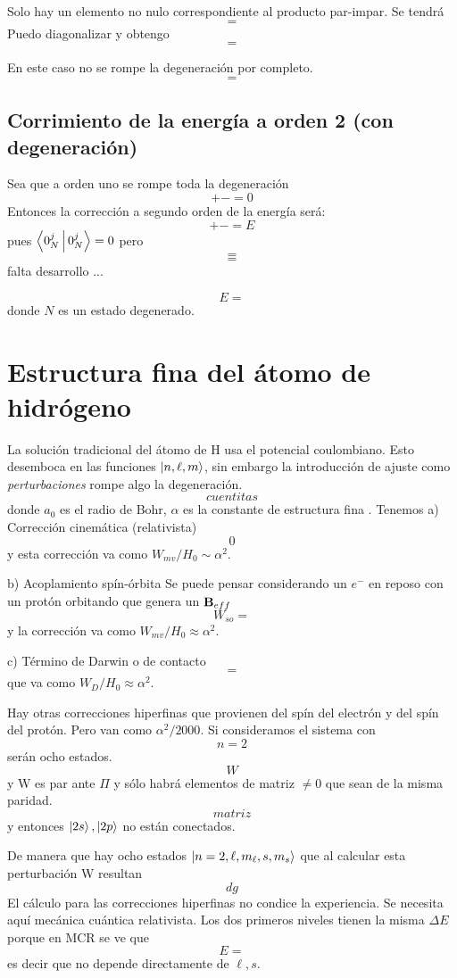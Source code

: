 \documentclass[10pt,oneside]{CBFT_book}
\begin{document}
Solo hay un elemento no nulo correspondiente al producto par-impar.
Se tendrá 
\[
	=
\]
Puedo diagonalizar y obtengo 
\[
	=
\]

En este caso no se rompe la degeneración por completo.
\[
	=
\]


\subsection{Corrimiento de la energía a orden 2 (con degeneración)}

Sea que a orden uno se rompe toda la degeneración 
\[
	+ - = 0
\]
Entonces la corrección a segundo orden de la energía será:
\[
	+ - = E
\]
pues $\Braket{0_N^j|0_N^j}= 0$ pero 
\[
	=
\]
\[
	=
\]
falta desarrollo ...

\[
	E =
\]
donde $N$ es un estado degenerado.

\section{Estructura fina del átomo de hidrógeno}

La solución tradicional del átomo de H usa el potencial coulombiano. Esto desemboca en las funciones 
$\Ket{n,\ell,m}$, sin embargo la introducción de ajuste como {\it perturbaciones} rompe algo la degeneración.
\[
	cuentitas
\]
donde $a_0$ es el radio de Bohr, $\alpha$ es la constante de estructura fina .
Tenemos 
a) Corrección cinemática (relativista)
\[	
	0
\]
y esta corrección va como $W_{mv}/H_0 \sim \alpha^2$.

b) Acoplamiento spín-órbita
Se puede pensar considerando un $e^-$ en reposo con un protón orbitando que genera un $\vb{B}_{eff}$
\[
	W_{so} =
\]
y la corrección va como $W_{mv}/H_0 \approx \alpha^2$.

c) Término de Darwin o de contacto
\[
	=
\]
que va como  $W_{D}/H_0 \approx \alpha^2$.

Hay otras correcciones hiperfinas que provienen del spín del electrón y del spín del protón. Pero van como 
$\alpha^2/2000$.
Si consideramos el sistema con 
\[
	n=2
\]
serán ocho estados.
\[
	W
\]
y W es par ante $\Pi$ y sólo habrá elementos de matriz $\neq 0$ que sean de la misma paridad.
\[
	matriz
\]
y entonces $\Ket{2s}, \Ket{2p}$ no están conectados.

De manera que hay ocho estados $\Ket{n=2,\ell,m_\ell,s,m_s}$ que al calcular esta perturbación W resultan 
\[
	dg
\]
El cálculo para las correcciones hiperfinas no condice la experiencia. Se necesita aquí mecánica cuántica 
relativista. Los dos primeros niveles tienen la misma $\Delta E$ porque en MCR se ve que 
\[
	E = 
\]
es decir que no depende directamente de $\ell,s$.
\end{document}
